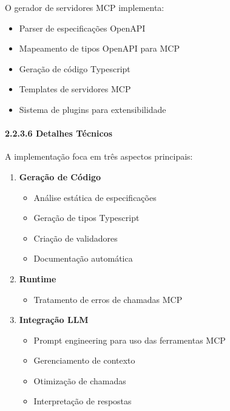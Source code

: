 \documentclass[
]{article}
\providecommand{\tightlist}{%
  \setlength{\itemsep}{0pt}\setlength{\parskip}{0pt}}
\begin{document}
O gerador de servidores MCP implementa:

\begin{itemize}
\tightlist
\item
  Parser de especificações OpenAPI
\item
  Mapeamento de tipos OpenAPI para MCP
\item
  Geração de código Typescript
\item
  Templates de servidores MCP
\item
  Sistema de plugins para extensibilidade
\end{itemize}

\paragraph{2.2.3.6 Detalhes Técnicos}\label{detalhes-tuxe9cnicos-1}

A implementação foca em três aspectos principais:

\begin{enumerate}
\def\labelenumi{\arabic{enumi}.}
\item
  \textbf{Geração de Código}

  \begin{itemize}
  \tightlist
  \item
    Análise estática de especificações
  \item
    Geração de tipos Typescript
  \item
    Criação de validadores
  \item
    Documentação automática
  \end{itemize}
\item
  \textbf{Runtime}

  \begin{itemize}
  \tightlist
  \item
    Tratamento de erros de chamadas MCP
  \end{itemize}
\item
  \textbf{Integração LLM}

  \begin{itemize}
  \tightlist
  \item
    Prompt engineering para uso das ferramentas MCP
  \item
    Gerenciamento de contexto
  \item
    Otimização de chamadas
  \item
    Interpretação de respostas
  \end{itemize}
\end{enumerate}
\end{document}
